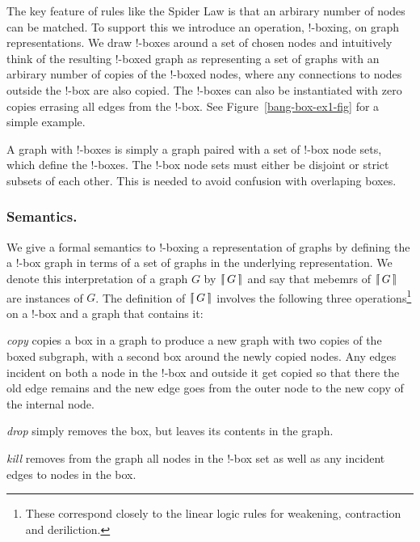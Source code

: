 \documentclass[runningheads]{llncs}
\newcommand{\binterp}[1]{\lceil\hspace{-0.27em}|\, #1\, |\hspace{-0.27em}\rceil}
\begin{document}
The key feature of rules like the Spider Law is that an arbirary
number of nodes can be matched. To support this we introduce an
operation, !-boxing, on graph representations. We draw !-boxes around
a set of chosen nodes and intuitively think of the resulting !-boxed
graph as representing a set of graphs with an arbirary number of
copies of the !-boxed nodes, where any connections to nodes outside
the !-box are also copied. The !-boxes can also be instantiated with
zero copies errasing all edges from the !-box. See
Figure~\ref{bang-box-ex1-fig} for a simple example. 

A graph with !-boxes is simply a graph paired with a set of !-box node
sets, which define the !-boxes. The !-box node sets must either be
disjoint or strict subsets of each other. This is needed to avoid
confusion with overlaping boxes. 

\subsubsection{Semantics.}

We give a formal semantics to !-boxing a representation of graphs by
defining the a !-box graph in terms of a set of graphs in the
underlying representation. We denote this interpretation of a graph
$G$ by $\binterp{G}$ and say that mebemrs of $\binterp{G}$ are
instances of $G$. The definition of $\binterp{G}$ involves the
following three operations\footnote{These correspond closely to the
  linear logic rules for weakening, contraction and deriliction.} on a
!-box and a graph that contains it:

\begin{definition}
  \emph{copy} copies a box in a graph to produce a new graph with two
  copies of the boxed subgraph, with a second box around the newly
  copied nodes. Any edges incident on both a node in the !-box and
  outside it get copied so that there the old edge remains and the new
  edge goes from the outer node to the new copy of the internal node.
\end{definition}

\begin{definition}
  \emph{drop} simply removes the box, but leaves its contents in the
  graph.
\end{definition}

\begin{definition}
  \emph{kill} removes from the graph all nodes in the !-box set as
  well as any incident edges to nodes in the box.
\end{definition}
\end{document}
